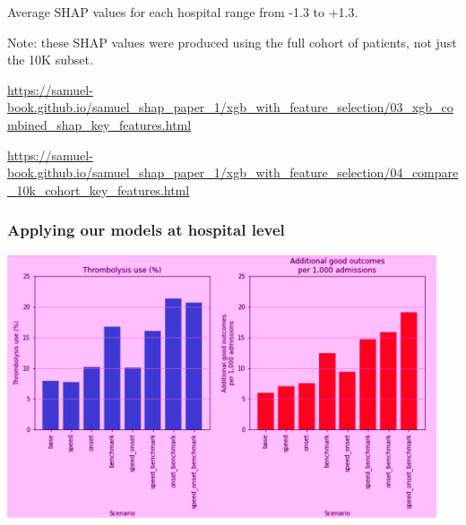 \documentclass[xcolor={usenames,dvipsnames}]{beamer}
\newcommand{\smallurl}[1]{\textcolor{blue}{\fontsize{4pt}{4.8pt}\selectfont \url{#1}}}
\begin{document}
\begin{frame}
\begin{columns}
\end{columns} 

Average SHAP values for each hospital range from -1.3 to +1.3.

\vspace{1em}
\footnotesize{Note: these SHAP values were produced using the full cohort of patients, not just the 10K subset.}

\smallurl{https://samuel-book.github.io/samuel_shap_paper_1/xgb_with_feature_selection/03_xgb_combined_shap_key_features.html}

\smallurl{https://samuel-book.github.io/samuel_shap_paper_1/xgb_with_feature_selection/04_compare_10k_cohort_key_features.html}


\end{frame}


\begin{frame}
\frametitle{Applying our models at hospital level}

\begin{center}
\includegraphics[width=0.95\textwidth]{./images_pink/hosp_scenario_1}
\end{center}

\end{frame}




\end{document}
